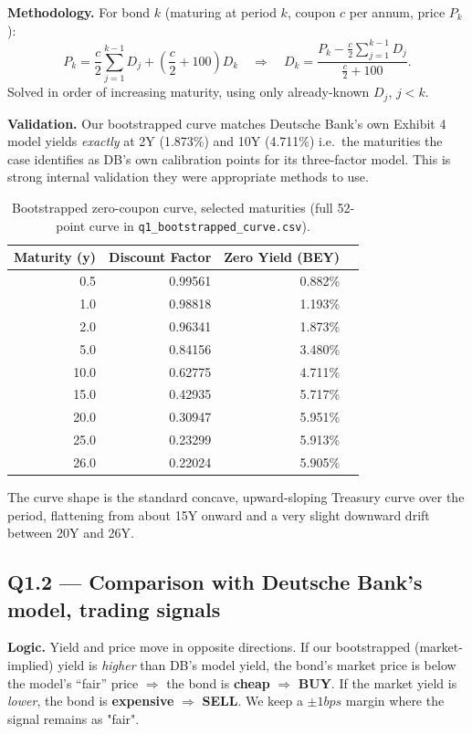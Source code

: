 \documentclass[11pt]{article}
\newcommand{\question}[1]{\subsection*{\textcolor{edhecred}{#1}}}
\begin{document}
\textbf{Methodology.} For bond $k$ (maturing at period $k$, coupon $c$ per
annum, price $P_k$):
$$P_k = \frac{c}{2}\sum_{j=1}^{k-1} D_j + \left(\frac{c}{2}+100\right)D_k
\quad\Longrightarrow\quad
D_k = \frac{P_k - \frac{c}{2}\sum_{j=1}^{k-1}D_j}{\frac{c}{2}+100}.$$
Solved in order of increasing maturity, using only already-known $D_j$, $j<k$.

\textbf{Validation.} Our bootstrapped curve matches Deutsche Bank's own
Exhibit 4 model yields \emph{exactly} at 2Y (1.873\%) and 10Y (4.711\%) 
i.e.\ the maturities the case identifies as DB's own calibration points
for its three-factor model. This is strong internal validation they were 
appropriate methods to use.

\begin{table}[h]
\centering
\small
\begin{tabular}{rrrr}
\toprule
Maturity (y) & Discount Factor & Zero Yield (BEY) \\
\midrule
0.5  & 0.99561 & 0.882\% \\
1.0  & 0.98818 & 1.193\% \\
2.0  & 0.96341 & 1.873\% \\
5.0  & 0.84156 & 3.480\% \\
10.0 & 0.62775 & 4.711\% \\
15.0 & 0.42935 & 5.717\% \\
20.0 & 0.30947 & 5.951\% \\
25.0 & 0.23299 & 5.913\% \\
26.0 & 0.22024 & 5.905\% \\
\bottomrule
\end{tabular}
\caption{Bootstrapped zero-coupon curve, selected maturities (full 52-point curve in \texttt{q1\_bootstrapped\_curve.csv}).}
\end{table}

The curve shape is the standard concave, upward-sloping Treasury curve over
the period, flattening from about 15Y onward and a very slight
downward drift between 20Y and 26Y.

\question{Q1.2 --- Comparison with Deutsche Bank's model, trading signals}

\textbf{Logic.} Yield and price move in opposite directions. If our
bootstrapped (market-implied) yield is \emph{higher} than DB's model yield,
the bond's market price is below the model's ``fair'' price $\Rightarrow$ the
bond is \textbf{cheap} $\Rightarrow$ \textbf{BUY}. If the market yield is
\emph{lower}, the bond is \textbf{expensive} $\Rightarrow$ \textbf{SELL}.
We keep a $\pm 1 bps$ margin where the signal remains as "fair".
\end{document}
